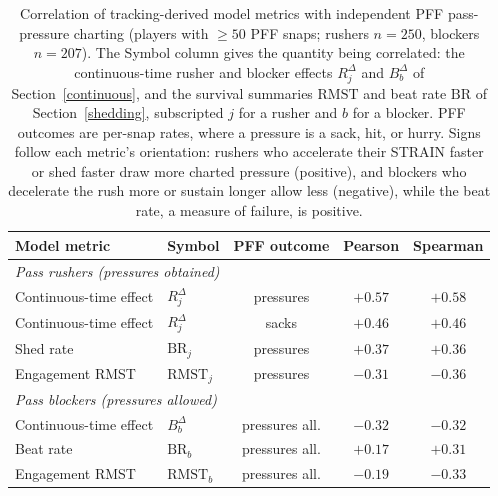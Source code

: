 \begin{table}[h!]
\centering
\footnotesize
\begin{tabular}{llccc}
\toprule
Model metric & Symbol & PFF outcome & Pearson & Spearman \\
\midrule
\multicolumn{5}{l}{\emph{Pass rushers (pressures obtained)}} \\
\quad Continuous-time effect & $R^{\Delta}_j$ & pressures & $+0.57$ & $+0.58$ \\
\quad Continuous-time effect & $R^{\Delta}_j$ & sacks & $+0.46$ & $+0.46$ \\
\quad Shed rate & $\mathrm{BR}_j$ & pressures & $+0.37$ & $+0.36$ \\
\quad Engagement RMST & $\mathrm{RMST}_j$ & pressures & $-0.31$ & $-0.36$ \\
\midrule
\multicolumn{5}{l}{\emph{Pass blockers (pressures allowed)}} \\
\quad Continuous-time effect & $B^{\Delta}_b$ & pressures all. & $-0.32$ & $-0.32$ \\
\quad Beat rate & $\mathrm{BR}_b$ & pressures all. & $+0.17$ & $+0.31$ \\
\quad Engagement RMST & $\mathrm{RMST}_b$ & pressures all. & $-0.19$ & $-0.33$ \\
\bottomrule
\end{tabular}
\caption{Correlation of tracking-derived model metrics with independent PFF pass-pressure charting (players with $\geq 50$ PFF snaps; rushers $n=250$, blockers $n=207$). The Symbol column gives the quantity being correlated: the continuous-time rusher and blocker effects $R^{\Delta}_j$ and $B^{\Delta}_b$ of Section~\ref{continuous}, and the survival summaries $\mathrm{RMST}$ and beat rate $\mathrm{BR}$ of Section~\ref{shedding}, subscripted $j$ for a rusher and $b$ for a blocker. PFF outcomes are per-snap rates, where a pressure is a sack, hit, or hurry. Signs follow each metric's orientation: rushers who accelerate their STRAIN faster or shed faster draw more charted pressure (positive), and blockers who decelerate the rush more or sustain longer allow less (negative), while the beat rate, a measure of failure, is positive.}
\label{tab:pff_validation}
\end{table}
